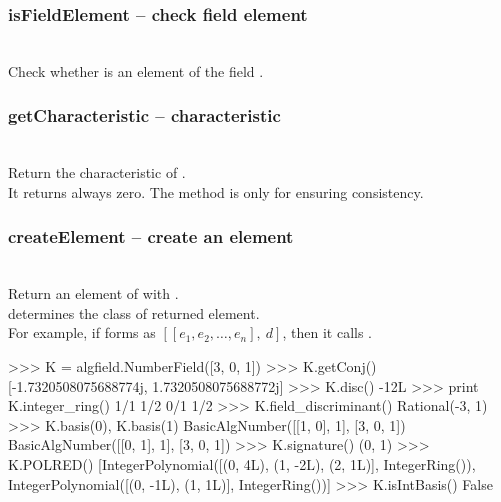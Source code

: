   \subsubsection{isFieldElement -- check field element}
  \\
  \spacing
  \quad Check whether  is an element of the field . \\
%  
  \subsubsection{getCharacteristic -- characteristic}
  \\
  \spacing
  \quad Return the characteristic of . \\
  \spacing
  \quad It returns always zero. The method is only for ensuring consistency.\\
%  
  \subsubsection{createElement -- create an element}
  \\
  \spacing
  \quad Return an element of  with . \\
  \spacing
  \quad {} determines the class of returned element.\\
  For example, if  forms as $[[e_1, e_2, \ldots, e_n],\ d]$, then it calls .\\
%  
\begin{ex}
>>> K = algfield.NumberField([3, 0, 1])
>>> K.getConj()
[-1.7320508075688774j, 1.7320508075688772j]
>>> K.disc()
-12L
>>> print K.integer_ring()
1/1 1/2
0/1 1/2
>>> K.field_discriminant()
Rational(-3, 1)
>>> K.basis(0), K.basis(1)
BasicAlgNumber([[1, 0], 1], [3, 0, 1]) BasicAlgNumber([[0, 1], 1], [3, 0, 1])
>>> K.signature()
(0, 1)
>>> K.POLRED()                     
[IntegerPolynomial([(0, 4L), (1, -2L), (2, 1L)], IntegerRing()), 
IntegerPolynomial([(0, -1L), (1, 1L)], IntegerRing())]
>>> K.isIntBasis()                 
False
\end{ex}%
\C
